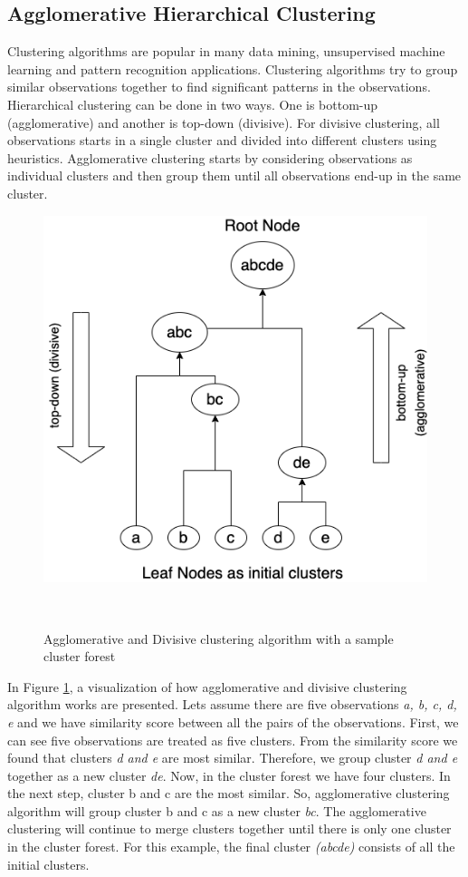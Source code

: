 \subsection{Agglomerative Hierarchical Clustering}
Clustering algorithms are popular in many data mining, unsupervised machine learning and pattern recognition applications. Clustering algorithms try to group similar observations together to find significant patterns in the observations. Hierarchical clustering can be done in two ways. One is bottom-up (agglomerative) and another is top-down (divisive). For divisive clustering, all observations starts in a single cluster and divided into different clusters using heuristics. Agglomerative clustering starts by considering observations as individual clusters and then group them until all observations end-up in the same cluster.

\begin{figure}[h]
  \centering
  \includegraphics[width=0.5\columnwidth, height=0.5\columnwidth]{figures/background/agglomerative_clustering.png}
  \caption{Agglomerative and Divisive clustering algorithm with a sample cluster forest}~\label{fig:agglomerative_clustering}
\end{figure}
In Figure \ref{fig:agglomerative_clustering}, a visualization of how agglomerative and divisive clustering algorithm works are presented. Lets assume there are five observations \emph{a, b, c, d, e} and we have similarity score between all the pairs of the observations. First, we can see five observations are treated as five clusters. From the similarity score we found that clusters \emph{d and e} are most similar. Therefore, we group cluster \emph{d and e} together as a new cluster \emph{de}. Now, in the cluster forest we have four clusters. In the next step, cluster b and c are the most similar. So, agglomerative clustering algorithm will group cluster b and c as a new cluster \emph{bc}. The agglomerative clustering will continue to merge clusters together until there is only one cluster in the cluster forest. For this example, the final cluster \emph{(abcde)} consists of all the initial clusters. 

